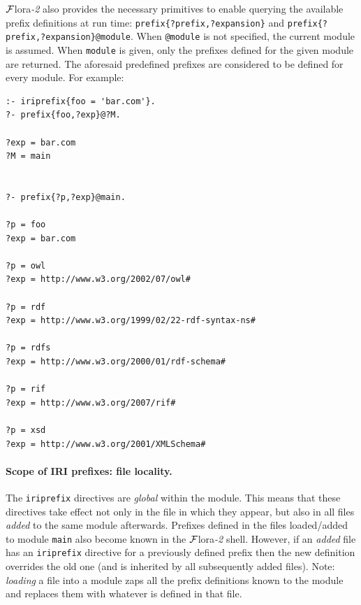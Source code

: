 \documentclass[11pt]{article}
\newcommand{\FLSYSTEM}{{\mbox{\sc ${\cal F}${lora}\rm\emph{-2}}}\xspace}
\begin{document}
\FLSYSTEM also provides the necessary primitives to enable querying the
available prefix definitions at run time:
\texttt{prefix\{?prefix,?expansion\}} and
\texttt{prefix\{?prefix,?expansion\}@module}.
When {\tt @module}  is not
specified, the current module is assumed. When {\tt module} is given,
only the prefixes defined for the given module are returned. The
aforesaid predefined prefixes are considered to be defined for every
module. For example:
\begin{verbatim}
:- iriprefix{foo = 'bar.com'}.
?- prefix{foo,?exp}@?M.

?exp = bar.com
?M = main


?- prefix{?p,?exp}@main.

?p = foo
?exp = bar.com

?p = owl
?exp = http://www.w3.org/2002/07/owl#

?p = rdf
?exp = http://www.w3.org/1999/02/22-rdf-syntax-ns#

?p = rdfs
?exp = http://www.w3.org/2000/01/rdf-schema#

?p = rif
?exp = http://www.w3.org/2007/rif#

?p = xsd
?exp = http://www.w3.org/2001/XMLSchema#
\end{verbatim}

\paragraph{Scope of IRI prefixes: file locality.}
The \texttt{iriprefix}  directives are \emph{global} within the module. 
This means that these directives take effect not only in the file in which they appear,
but also in all files \emph{added} to the same module afterwards.
Prefixes defined in  the files loaded/added to module \texttt{main}  also
become known in the \FLSYSTEM shell. However, if an \emph{added} file has an
\texttt{iriprefix} directive for a previously defined prefix then the new
definition overrides the old one (and is inherited by all subsequently
added files). Note: \emph{loading}  a file into a module
zaps all the prefix definitions known  
to the module and replaces them with whatever is defined in that file.
\end{document}
